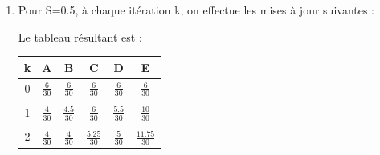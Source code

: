\begin{enumerate}
    \item Pour S=0.5, à chaque itération k, on effectue les mises à jour suivantes :
    
    Le tableau résultant est :
    \begin{center}
        \begin{tabular}{c|ccccc}
        k & A & B & C & D & E\\ \hline 
    	0 & $\frac{6}{30}$ & $\frac{6}{30}$ & $\frac{6}{30}$ & $\frac{6}{30}$ & $\frac{6}{30}$\\ \\
    	1 & $\frac{4}{30}$ & $\frac{4.5}{30}$ & $\frac{6}{30}$ & $\frac{5.5}{30}$ & $\frac{10}{30}$\\ \\
    	2 & $\frac{4}{30}$ & $\frac{4}{30}$ & $\frac{5.25}{30}$ & $\frac{5}{30}$ & $\frac{11.75}{30}$\\
    	\end{tabular}
    \end{center}


\end{enumerate}